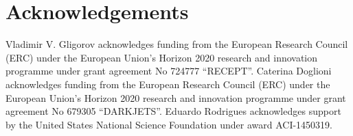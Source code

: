 \section*{Acknowledgements}
Vladimir V. Gligorov acknowledges funding from the European Research Council (ERC) under the European Union's Horizon 2020 research and innovation programme under grant agreement No 724777 ``RECEPT''. Caterina Doglioni acknowledges funding from the European Research Council (ERC) under the European Union's Horizon 2020 research and innovation programme under grant agreement No 679305  ``DARKJETS''.  Eduardo Rodrigues acknowledges support by the United States National Science Foundation under award ACI-1450319.
